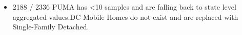 \begin{itemize}
\item 2188 / 2336 PUMA has <10 samples and are falling back to state level aggregated values.DC Mobile Homes do not exist and are replaced with Single-Family Detached.
\end{itemize}
